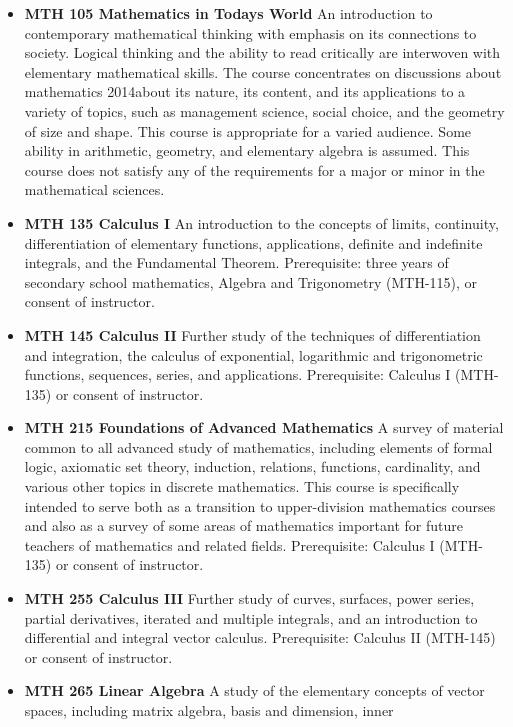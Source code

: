 \documentclass[
  letterpaper,
]{scrbook}
\providecommand{\tightlist}{%
  \setlength{\itemsep}{0pt}\setlength{\parskip}{0pt}}
\begin{document}
\begin{itemize}
\tightlist
\item
  \textbf{MTH 105 Mathematics in Todays World} An introduction to
  contemporary mathematical thinking with emphasis on its connections to
  society. Logical thinking and the ability to read critically are
  interwoven with elementary mathematical skills. The course
  concentrates on discussions about mathematics 2014about its nature,
  its content, and its applications to a variety of topics, such as
  management science, social choice, and the geometry of size and shape.
  This course is appropriate for a varied audience. Some ability in
  arithmetic, geometry, and elementary algebra is assumed. This course
  does not satisfy any of the requirements for a major or minor in the
  mathematical sciences.
\item
  \textbf{MTH 135 Calculus I} An introduction to the concepts of limits,
  continuity, differentiation of elementary functions, applications,
  definite and indefinite integrals, and the Fundamental Theorem.
  Prerequisite: three years of secondary school mathematics, Algebra and
  Trigonometry (MTH-115), or consent of instructor.
\item
  \textbf{MTH 145 Calculus II} Further study of the techniques of
  differentiation and integration, the calculus of exponential,
  logarithmic and trigonometric functions, sequences, series, and
  applications. Prerequisite: Calculus I (MTH-135) or consent of
  instructor.
\item
  \textbf{MTH 215 Foundations of Advanced Mathematics} A survey of
  material common to all advanced study of mathematics, including
  elements of formal logic, axiomatic set theory, induction, relations,
  functions, cardinality, and various other topics in discrete
  mathematics. This course is specifically intended to serve both as a
  transition to upper-division mathematics courses and also as a survey
  of some areas of mathematics important for future teachers of
  mathematics and related fields. Prerequisite: Calculus I (MTH-135) or
  consent of instructor.
\item
  \textbf{MTH 255 Calculus III} Further study of curves, surfaces, power
  series, partial derivatives, iterated and multiple integrals, and an
  introduction to differential and integral vector calculus.
  Prerequisite: Calculus II (MTH-145) or consent of instructor.
\item
  \textbf{MTH 265 Linear Algebra} A study of the elementary concepts of
  vector spaces, including matrix algebra, basis and dimension, inner

\end{itemize}
\end{document}
